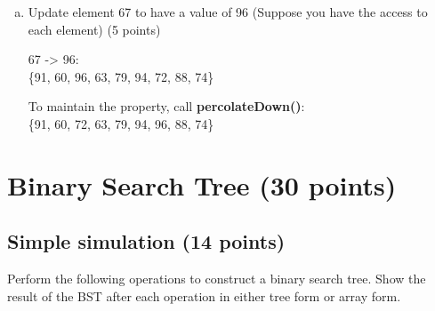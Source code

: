 \documentclass[11pt]{exam}
\begin{document}
\begin{enumerate}[a)]
\item Update element 67 to have a value of 96 (Suppose you have the access to each element) (5 points)
\begin{solution}
\par
67 -> 96: \\
\{91, 60, 96, 63, 79, 94, 72, 88, 74\}
\par
To maintain the property, call \textbf{percolateDown()}: \\
\{91, 60, 72, 63, 79, 94, 96, 88, 74\}
\end{solution}

\end{enumerate}

\section{Binary Search Tree (30 points)}
\subsection{Simple simulation (14 points)}

Perform the following operations to construct a binary search tree. Show the result of the BST after each operation in either tree form or array form.
\end{document}
